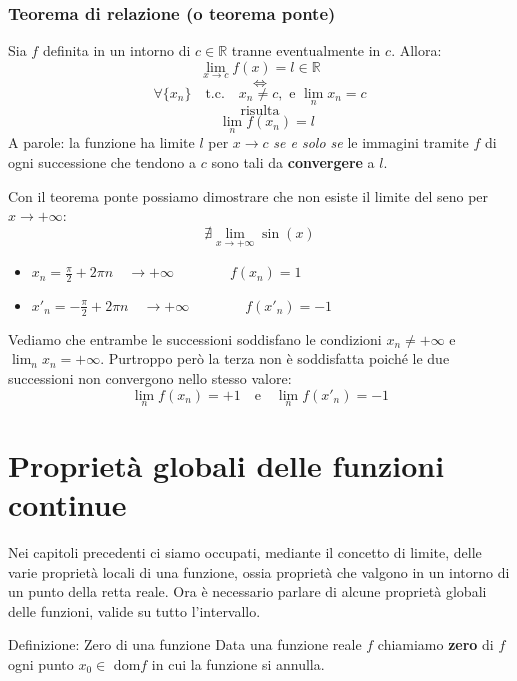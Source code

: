 \documentclass[x11names]{article}
\begin{document}
	\begin{center}
		\colorbox{myred}{\begin{minipage}{5.75in}
				\begin{redes}{}
					\subsubsection{Teorema di relazione (o teorema ponte)}
					Sia $f$ definita in un intorno di $c \in \mathbb{R}$ tranne eventualmente in $c$. Allora:
					\[
					\lim_{x \to c} f(x) = l \in \mathbb{R} 
					\]
					\[
					\Longleftrightarrow
					\]
					 \[
					 \forall \{x_n\} \quad \text{t.c.} \quad x_n \neq c, \text{ e } \lim_{n}x_n = c 
					 \]
					 \[
					 \text{risulta} 
					 \]
					 \[
					 \quad \lim_{n} f(x_n) = l
					 \]
					A parole: la funzione ha limite $l$ per $x \to c$ \textit{se e solo se} le immagini tramite $f$ di ogni successione che tendono a $c$ sono tali da \textbf{convergere} a $l$.
				\end{redes}
		\end{minipage}}        
	\end{center}
	Con il teorema ponte possiamo dimostrare che non esiste il limite del seno per $x \to +\infty$:
	\[
	\nexists \lim_{x \to +\infty}\sin(x)
	\]
	\begin{itemize}
		\item $x_n = \frac{\pi}{2} + 2 \pi n \quad \to +\infty \qquad \qquad f(x_n) = 1$
		\item $x'_n = -\frac{\pi}{2} + 2 \pi n \quad \to +\infty\qquad \qquad f(x'_n) = -1$
	\end{itemize}
	Vediamo che entrambe le successioni soddisfano le condizioni $x_n \neq +\infty$ e $\lim_{n}x_n = +\infty$. Purtroppo però la terza non è soddisfatta poiché le due successioni non convergono nello stesso valore:
	\[
	\lim_{n}f(x_n) = +1 \quad \text{e} \quad \lim_{n}f(x'_n) = -1
	\]
	\newpage
	\section{Proprietà globali delle funzioni continue}
	Nei capitoli precedenti ci siamo occupati, mediante il concetto di limite, delle varie proprietà locali di una funzione, ossia proprietà che valgono in un intorno di un punto della retta reale. Ora è necessario parlare di alcune proprietà globali delle funzioni, valide su tutto l'intervallo.
	
	\begin{center}
		\colorbox{myblue}{\begin{minipage}{5.75in}
				\begin{blues}{Definizione: Zero di una funzione}
					Data una funzione reale $f$ chiamiamo \textbf{zero} di $f$ ogni punto $x_0 \in$ dom$f$ in cui la funzione si annulla.
				\end{blues}
		\end{minipage}}        
	\end{center}
	
\end{document}
